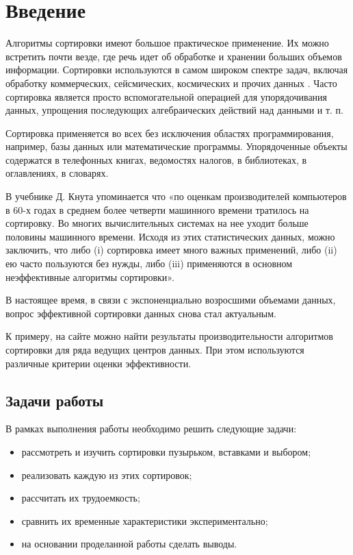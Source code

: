 \chapter*{Введение}

Алгоритмы сортировки имеют большое практическое применение.
Их можно встретить почти везде, где речь идет об обработке и хранении больших объемов информации.
Сортировки используются в самом широком спектре задач, включая обработку коммерческих, сейсмических, космических и прочих данных \cite{support-office}.
Часто сортировка является просто вспомогательной операцией для упорядочивания данных, упрощения последующих алгебраических действий над данными и т. п.

Сортировка применяется во всех без исключения областях программирования, например, базы данных или математические программы.
Упорядоченные объекты содержатся в телефонных книгах, ведомостях налогов, в библиотеках, в оглавлениях, в словарях.

В учебнике \cite[стр. 21]{Knut} Д. Кнута упоминается что «по оценкам производителей компьютеров в 60-х годах в среднем более четверти машинного времени тратилось на сортировку.
Во многих вычислительных системах на нее уходит больше половины машинного времени.
Исходя из этих статистических данных, можно заключить, что либо (i) сортировка имеет много важных применений, либо (ii) ею часто пользуются без нужды, либо (iii) применяются в основном неэффективные алгоритмы сортировки». 

В настоящее время, в связи с экспоненциально возросшими объемами данных, вопрос эффективной сортировки данных снова стал актуальным.

К примеру, на сайте \cite{sort-benchmark} можно найти результаты производительности алгоритмов сортировки для ряда ведущих центров данных.
При этом используются различные критерии оценки эффективности.

\section*{Задачи работы}

В рамках выполнения работы необходимо решить следующие задачи:
\begin{itemize}
	\item рассмотреть и изучить сортировки пузырьком, вставками и выбором;
	\item реализовать каждую из этих сортировок;
	\item рассчитать их трудоемкость;
	\item сравнить их временные характеристики экспериментально;
	\item на основании проделанной работы сделать выводы.
\end{itemize}
